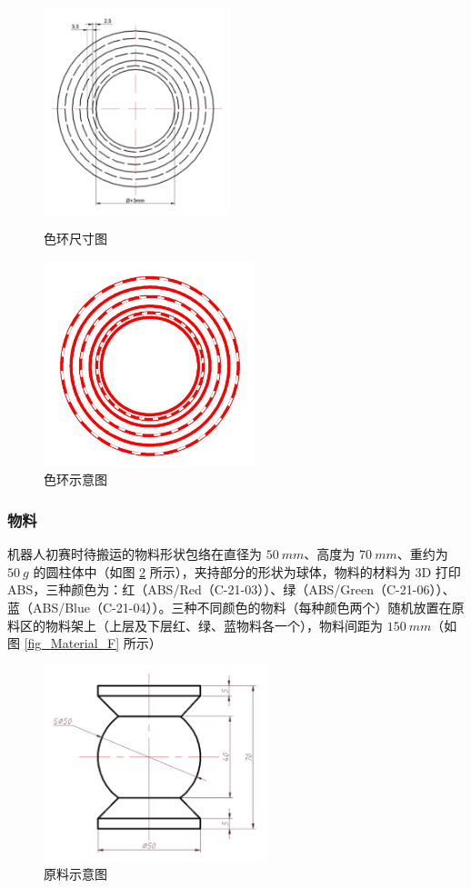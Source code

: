 \documentclass[a4paper,11pt,UTF8]{ctexart}
\begin{document}
\begin{figure}[htbp]
  \begin{center}
    \begin{minipage}[t]{0.45\linewidth}
      \centering
      \includegraphics[height=6cm]{色环.jpg}
      \caption{色环尺寸图}\label{fig_Target}
    \end{minipage}%
    \begin{minipage}[t]{0.45\linewidth}
      \centering
      \includegraphics[height=6cm]{色环_.jpg}
      \caption{色环示意图}\label{fig_Target_}
    \end{minipage}
  \end{center}
\end{figure}


\subsubsection{物料}
机器人初赛时待搬运的物料形状包络在直径为 $50~mm$、高度为 $70~mm$、重约为$50~g$ 的圆柱体中（如图 \ref{fig_Material} 所示），夹持部分的形状为球体，物料的材料为 3D 打印ABS，三种颜色为：红（ABS/Red（C-21-03））、绿（ABS/Green（C-21-06））、蓝（ABS/Blue（C-21-04））。三种不同颜色的物料（每种颜色两个）随机放置在原料区的物料架上（上层及下层红、绿、蓝物料各一个），物料间距为 $150~mm$（如图 \ref{fig_Material_F} 所示）
\begin{figure}[htbp]
  \centering
  \includegraphics[width=6.5cm]{物料.jpg}
  \caption{原料示意图} \label{fig_Material}
\end{figure}
\end{document}
